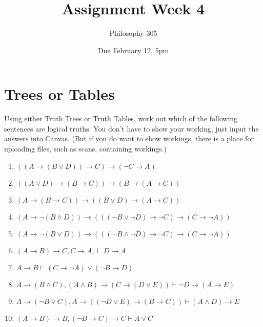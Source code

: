 \documentclass[
  11pt,
]{article}
\title{Assignment Week 4}
\author{Philosophy 305}
\date{Due February 12, 5pm}
\providecommand{\tightlist}{%
  \setlength{\itemsep}{0pt}\setlength{\parskip}{0pt}}
\begin{document}
\maketitle

\hypertarget{trees-or-tables}{%
\section{Trees or Tables}\label{trees-or-tables}}

Using either Truth Trees or Truth Tables, work out which of the
following sentences are logical truths. You don't have to show your
working, just input the answers into Canvas. (But if you do want to show
workings, there is a place for uploading files, such as scans,
containing workings.)

\begin{enumerate}
\def\labelenumi{\arabic{enumi}.}
\tightlist
\item
  \(((A \rightarrow (B \vee D)) \rightarrow C) \rightarrow (\neg C \rightarrow A)\)
\item
  \(((A \vee D) \rightarrow (B \rightarrow C)) \rightarrow (B \rightarrow (A \rightarrow C))\)
\item
  \((A \rightarrow (B \rightarrow C)) \rightarrow ((B \vee D) \rightarrow (A \rightarrow C))\)
\item
  \((A \rightarrow \neg (B \wedge D)) \rightarrow (((\neg B \vee \neg D) \rightarrow \neg C) \rightarrow (C \rightarrow \neg A))\)
\item
  \((A \rightarrow \neg (B \vee D)) \rightarrow (((\neg B \wedge \neg D) \rightarrow \neg C) \rightarrow (C \rightarrow \neg A))\)
\item
  \((A \rightarrow B) \rightarrow C, C \rightarrow A, \vdash D \rightarrow A\)
\item
  \(A \rightarrow B \vdash (C \rightarrow \neg A) \vee (\neg B \rightarrow D)\)
\item
  \(A \rightarrow (B \wedge C), (A \wedge B) \rightarrow (C \rightarrow (D \vee E)) \vdash \neg D \rightarrow (A \rightarrow E)\)
\item
  \(A \rightarrow (\neg B \vee C), A \rightarrow ((\neg D \vee E) \rightarrow (B \rightarrow C)) \vdash (A \wedge D) \rightarrow E\)
\item
  \((A \rightarrow B) \rightarrow B, (\neg B \rightarrow C) \rightarrow C \vdash A \vee C\)
\end{enumerate}
\end{document}
